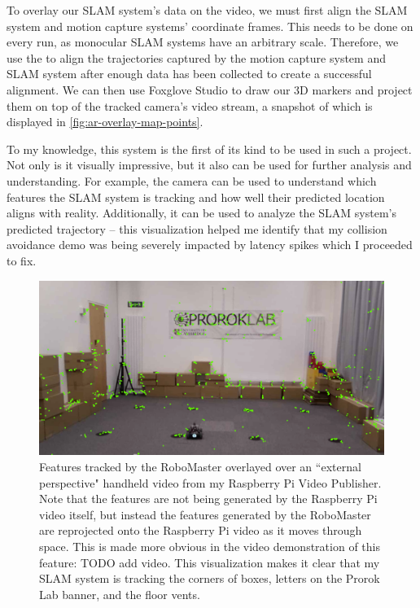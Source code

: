To overlay our SLAM system's data on the video, we must first align the SLAM system and motion capture systems' coordinate frames. This needs to be done on every run, as monocular SLAM systems have an arbitrary scale. Therefore, we use the  to align the trajectories captured by the motion capture system and SLAM system after enough data has been collected to create a successful alignment. We can then use Foxglove Studio to draw our 3D markers and project them on top of the tracked camera's video stream, a snapshot of which is displayed in \autoref{fig:ar-overlay-map-points}.

To my knowledge, this system is the first of its kind to be used in such a project. Not only is it visually impressive, but it also can be used for further analysis and understanding. For example, the camera can be used to understand which features the SLAM system is tracking and how well their predicted location aligns with reality. Additionally, it can be used to analyze the SLAM system's predicted trajectory – this visualization helped me identify that my collision avoidance demo was being severely impacted by latency spikes which I proceeded to fix.

\begin{figure}[h]
    \centering
    \includegraphics[width=\linewidth]{figures/ar_overlay_map_points.png}

    \caption{Features tracked by the RoboMaster overlayed over an ``external perspective" handheld video from my Raspberry Pi Video Publisher. Note that the features are not being generated by the Raspberry Pi video itself, but instead the features generated by the RoboMaster are reprojected onto the Raspberry Pi video as it moves through space. This is made more obvious in the video demonstration of this feature: TODO add video. \captionbreak This visualization makes it clear that my SLAM system is tracking the corners of boxes, letters on the Prorok Lab banner, and the floor vents.}
    \label{fig:ar-overlay-map-points}
\end{figure}

